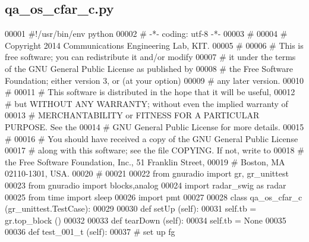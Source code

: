 \subsection{qa\+\_\+os\+\_\+cfar\+\_\+c.\+py}
\label{qa__os__cfar__c_8py_source}

\begin{DoxyCode}
00001 \textcolor{comment}{#!/usr/bin/env python}
00002 \textcolor{comment}{# -*- coding: utf-8 -*-}
00003 \textcolor{comment}{# }
00004 \textcolor{comment}{# Copyright 2014 Communications Engineering Lab, KIT.}
00005 \textcolor{comment}{# }
00006 \textcolor{comment}{# This is free software; you can redistribute it and/or modify}
00007 \textcolor{comment}{# it under the terms of the GNU General Public License as published by}
00008 \textcolor{comment}{# the Free Software Foundation; either version 3, or (at your option)}
00009 \textcolor{comment}{# any later version.}
00010 \textcolor{comment}{# }
00011 \textcolor{comment}{# This software is distributed in the hope that it will be useful,}
00012 \textcolor{comment}{# but WITHOUT ANY WARRANTY; without even the implied warranty of}
00013 \textcolor{comment}{# MERCHANTABILITY or FITNESS FOR A PARTICULAR PURPOSE.  See the}
00014 \textcolor{comment}{# GNU General Public License for more details.}
00015 \textcolor{comment}{# }
00016 \textcolor{comment}{# You should have received a copy of the GNU General Public License}
00017 \textcolor{comment}{# along with this software; see the file COPYING.  If not, write to}
00018 \textcolor{comment}{# the Free Software Foundation, Inc., 51 Franklin Street,}
00019 \textcolor{comment}{# Boston, MA 02110-1301, USA.}
00020 \textcolor{comment}{# }
00021 
00022 \textcolor{keyword}{from} gnuradio \textcolor{keyword}{import} gr, gr\_unittest
00023 \textcolor{keyword}{from} gnuradio \textcolor{keyword}{import} blocks,analog
00024 \textcolor{keyword}{import} radar\_swig \textcolor{keyword}{as} radar
00025 \textcolor{keyword}{from} time \textcolor{keyword}{import} sleep
00026 \textcolor{keyword}{import} pmt
00027 
00028 \textcolor{keyword}{class }qa_os_cfar_c (gr\_unittest.TestCase):
00029 
00030     \textcolor{keyword}{def }setUp (self):
00031         self.tb = gr.top\_block ()
00032 
00033     \textcolor{keyword}{def }tearDown (self):
00034         self.tb = \textcolor{keywordtype}{None}
00035 
00036     \textcolor{keyword}{def }test_001_t (self):
00037         \textcolor{comment}{# set up fg}

\end{DoxyCode}
